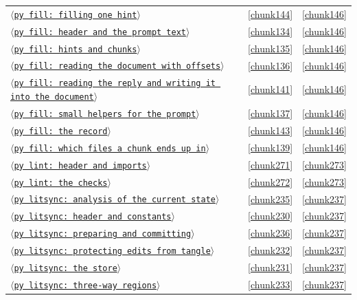 \documentclass[10pt,a4paper]{article}
\newcounter{chunk}
\newcommand{\chunkname}[1]{\ensuremath{\langle}\texttt{#1}\ensuremath{\rangle}}
\begin{document}
\begin{longtable}{@{}p{}rp{}@{}}
\hyperref[chunk144]{\chunkname{py fill: filling one hint}} & \ref*{chunk144} & \hyperref[chunk146]{\ref*{chunk146}} \\
\hyperref[chunk134]{\chunkname{py fill: header and the prompt text}} & \ref*{chunk134} & \hyperref[chunk146]{\ref*{chunk146}} \\
\hyperref[chunk135]{\chunkname{py fill: hints and chunks}} & \ref*{chunk135} & \hyperref[chunk146]{\ref*{chunk146}} \\
\hyperref[chunk136]{\chunkname{py fill: reading the document with offsets}} & \ref*{chunk136} & \hyperref[chunk146]{\ref*{chunk146}} \\
\hyperref[chunk141]{\chunkname{py fill: reading the reply and writing it into the document}} & \ref*{chunk141} & \hyperref[chunk146]{\ref*{chunk146}} \\
\hyperref[chunk137]{\chunkname{py fill: small helpers for the prompt}} & \ref*{chunk137} & \hyperref[chunk146]{\ref*{chunk146}} \\
\hyperref[chunk143]{\chunkname{py fill: the record}} & \ref*{chunk143} & \hyperref[chunk146]{\ref*{chunk146}} \\
\hyperref[chunk139]{\chunkname{py fill: which files a chunk ends up in}} & \ref*{chunk139} & \hyperref[chunk146]{\ref*{chunk146}} \\
\hyperref[chunk271]{\chunkname{py lint: header and imports}} & \ref*{chunk271} & \hyperref[chunk273]{\ref*{chunk273}} \\
\hyperref[chunk272]{\chunkname{py lint: the checks}} & \ref*{chunk272} & \hyperref[chunk273]{\ref*{chunk273}} \\
\hyperref[chunk235]{\chunkname{py litsync: analysis of the current state}} & \ref*{chunk235} & \hyperref[chunk237]{\ref*{chunk237}} \\
\hyperref[chunk230]{\chunkname{py litsync: header and constants}} & \ref*{chunk230} & \hyperref[chunk237]{\ref*{chunk237}} \\
\hyperref[chunk236]{\chunkname{py litsync: preparing and committing}} & \ref*{chunk236} & \hyperref[chunk237]{\ref*{chunk237}} \\
\hyperref[chunk232]{\chunkname{py litsync: protecting edits from tangle}} & \ref*{chunk232} & \hyperref[chunk237]{\ref*{chunk237}} \\
\hyperref[chunk231]{\chunkname{py litsync: the store}} & \ref*{chunk231} & \hyperref[chunk237]{\ref*{chunk237}} \\
\hyperref[chunk233]{\chunkname{py litsync: three-way regions}} & \ref*{chunk233} & \hyperref[chunk237]{\ref*{chunk237}} \\

\end{longtable}
\end{document}
